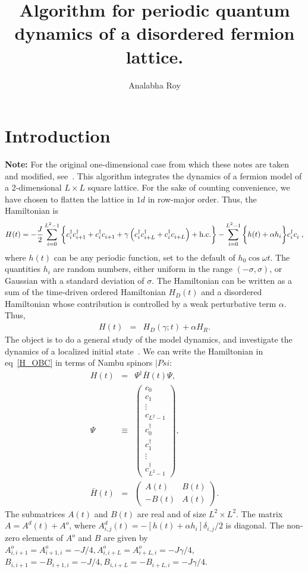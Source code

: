 \documentclass[a4paper,10pt]{article}
\title{Algorithm for periodic quantum dynamics of a disordered fermion lattice.}
\author{Analabha Roy}
\begin{document}
\maketitle

\section{\sc Introduction}
\label{sec:intro}
\textbf{Note:} For the original one-dimensional case from which these notes are taken and modified, see~\cite{myisingrand:suppl}.
This algorithm integrates the dynamics of a fermion model of a 2-dimensional $L\times L$ square lattice. For the sake of counting convenience, we have chosen to flatten the lattice in $1d$ in row-major order. Thus, the Hamiltonian is
\begin{equation} \label{H_OBC}
H(t) = -  \frac{J}{2} \sum_{i=0}^{L^2-1}   \bigg\{c^{\dagger}_i c^{\dagger}_{i+1} + c^{\dagger}_i c^{\;}_{i+1} + \gamma \left(c^{\dagger}_i c^{\dagger}_{i+L} + c^{\dagger}_i c^{\;}_{i+L}\right)  + {\rm h.c.}\bigg\} 
    -  \sum_{i=0}^{L^2-1} \bigg\{h(t)+\alpha h_i\bigg\} c^{\dagger}_i c^{\;}_i \;,
\end{equation}
where $h(t)$ can be any periodic function, set to the default of $h_0\cos{\omega t}$. The quantities $h_i$ are random numbers, either uniform in the range $(-\sigma,\sigma)$, or Gaussian with a standard deviation of $\sigma$. The Hamiltonian can be written as a sum of the time-driven ordered Hamiltonian $ H_D(t)$ and a disordered Hamiltonian whose contribution is controlled by a weak perturbative term $\alpha$. Thus,
\begin{eqnarray}
H(t)&=& H_D(\gamma;t)+\alpha H_R.
\end{eqnarray}
The object is to do a general study of the model dynamics, and investigate the dynamics of a localized initial state~\cite{arnab1}. We can write the Hamiltonian in eq~\ref{H_OBC} in terms of Nambu spinors $|Psi$:
\begin{eqnarray}
H(t) &=& \Psi^\dagger \bar{H}(t)\Psi,\nonumber\\
\Psi &\equiv& \begin{pmatrix}
c_0\\
c_1\\
\vdots\\
c_{L^2-1}\\
c^\dagger_0\\
c^\dagger_1\\
\vdots\\
c^\dagger_{L^2-1}
\end{pmatrix},\nonumber \\
\bar{H}(t) &=&\begin{pmatrix}
A(t) & B(t)\\
-B(t) & A(t)
\end{pmatrix}.
\label{eq:nambu}
\end{eqnarray}
The submatrices $A(t)$ and $B(t)$ are real and of size $L^2\times L^2$. The matrix $A=A^d(t)+A^o$, where $A^d_{i,j}(t)=-\left[h(t)+\alpha h_i\right]\delta_{i,j}/2$ is diagonal. The
non-zero elements of $A^o$ and $B$ are given by $A^o_{i,i+1}=A^o_{i+1,i}=-J/4, A^o_{i,i+L}=A^o_{i+L,i}=-J\gamma/4$, $B_{i,i+1}=-B_{i+1,i}=- J/4, B_{i,i+L}=-B_{i+L,i}=- J\gamma/4$.
\end{document}
